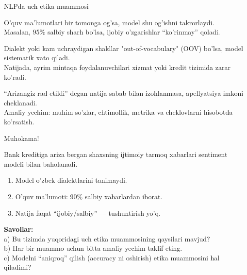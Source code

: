 \documentclass[aspectratio=169,11pt]{beamer}
\begin{document}
\begin{frame}{NLPda uch etika muammosi}
  \begin{tcolorbox}[warnbox,title=1.\ Bir tomonga og'gan (biased) ma'lumot]
    \footnotesize
    O'quv ma'lumotlari bir tomonga og'sa, model shu og'ishni takrorlaydi.\\
    Masalan, 95\% salbiy sharh bo'lsa, ijobiy o'zgarishlar ``ko'rinmay'' qoladi.
  \end{tcolorbox}
  \vspace{2pt}
  \begin{tcolorbox}[warnbox,title=2.\ Kam resursli til va dialekt]
    \footnotesize
    Dialekt yoki kam uchraydigan shakllar "out-of-vocabulary" (OOV) bo'lsa, model sistematik xato qiladi.\\
    Natijada, ayrim mintaqa foydalanuvchilari xizmat yoki kredit tizimida zarar ko'radi.
  \end{tcolorbox}
  \vspace{2pt}
  \begin{tcolorbox}[warnbox,title=3.\ Shaffoflik yetishmasligi]
    \footnotesize
    ``Arizangiz rad etildi'' degan natija sabab bilan izohlanmasa, apellyatsiya imkoni cheklanadi.\\
    Amaliy yechim: muhim so'zlar, ehtimollik, metrika va cheklovlarni hisobotda ko'rsatish.
  \end{tcolorbox}
\end{frame}

\begin{frame}{Muhokama!}
  \begin{tcolorbox}[warnbox,title=Vaziyat (5 daqiqa)]
    \small
    Bank kreditiga ariza bergan shaxsning ijtimoiy tarmoq
    xabarlari sentiment modeli bilan baholanadi.\\[5pt]
    \begin{enumerate}
      \item Model o'zbek dialektlarini tanimaydi.
      \item  O'quv ma'lumoti: 90\% salbiy xabarlardan iborat.
      \item Natija faqat ``ijobiy/salbiy'' --- tushuntirish yo'q.
    \end{enumerate}
    \vspace{5pt}
    \textbf{Savollar:}\\[3pt]
    a)\; Bu tizimda yuqoridagi uch etika muammosining qaysilari mavjud?\\[3pt]
    b)\; Har bir muammo uchun bitta amaliy yechim taklif eting.\\[3pt]
    c)\; Modelni ``aniqroq'' qilish (accuracy ni oshirish) etika
         muammosini hal qiladimi?
  \end{tcolorbox}

\end{frame}
\end{document}
